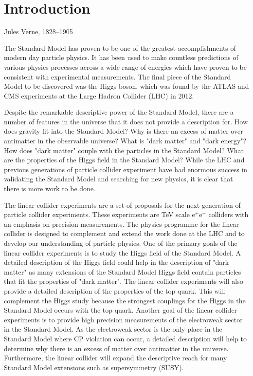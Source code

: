 \chapter{Introduction}
\label{chap:introduction}

{Jules Verne, 1828--1905}


The Standard Model has proven to be one of the greatest accomplishments of modern day particle physics.  It has been used to make countless predictions of various physics processes across a wide range of energies which have proven to be consistent with experimental measurements.  The final piece of the Standard Model to be discovered was the Higgs boson, which was found by the ATLAS \cite{Aad:2012tfa} and CMS \cite{Chatrchyan:2012xdj} experiments at the Large Hadron Collider (LHC) in 2012.  

Despite the remarkable descriptive power of the Standard Model, there are a number of features in the universe that it does not provide a description for.  How does gravity fit into the Standard Model?  Why is there an excess of matter over antimatter in the observable universe?  What is "dark matter" and "dark energy"?  How does "dark matter" couple with the particles in the Standard Model?  What are the properties of the Higgs field in the Standard Model?  While the LHC and previous generations of particle collider experiment have had enormous success in validating the Standard Model and searching for new physics, it is clear that there is more work to be done. 

The linear collider experiments are a set of proposals for the next generation of particle collider experiments.  These experiments are TeV scale $\text{e}^{+}\text{e}^{-}$ colliders with an emphasis on precision measurements.  The physics programme for the linear collider is designed to complement and extend the work done at the LHC and to develop our understanding of particle physics.  One of the primary goals of the linear collider experiments is to study the Higgs field of the Standard Model.  A detailed description of the Higgs field could help in the description of "dark matter" as many extensions of the Standard Model Higgs field contain particles that fit the properties of "dark matter".  The linear collider experiments will also provide a detailed description of the properties of the top quark.  This will complement the Higgs study because the strongest couplings for the Higgs in the Standard Model occurs with the top quark.  Another goal of the linear collider experiments is to provide high precision measurements of the electroweak sector in the Standard Model.  As the electroweak sector is the only place in the Standard Model where CP violation can occur, a detailed description will help to determine why there is an excess of matter over antimatter in the universe.  Furthermore, the linear collider will expand the descriptive reach for many Standard Model extensions such as supersymmetry (SUSY).


